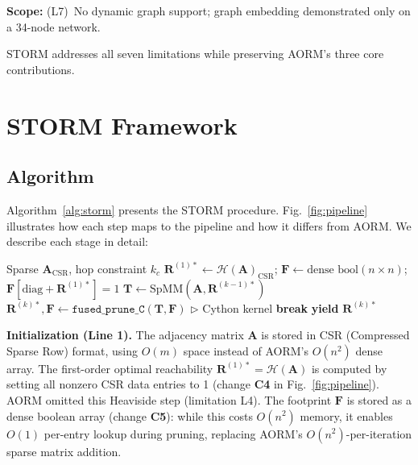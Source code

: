 \documentclass[journal]{IEEEtran}
\begin{document}
\textbf{Scope:} (L7)~No dynamic graph support; graph embedding demonstrated only on a 34-node network.

STORM addresses all seven limitations while preserving AORM's three core contributions.


\section{STORM Framework}
\label{sec:storm}

\subsection{Algorithm}

Algorithm~\ref{alg:storm} presents the STORM procedure. Fig.~\ref{fig:pipeline} illustrates how each step maps to the pipeline and how it differs from AORM. We describe each stage in detail:

\begin{algorithm}[t]
\caption{STORM: Sparse $k$-Order Optimal Reachability}
\label{alg:storm}
\begin{algorithmic}[1]
\REQUIRE Sparse $\mathbf{A}_{\text{CSR}}$, hop constraint $k_c$
\STATE $\mathbf{R}^{(1)*}\!\leftarrow\!\mathcal{H}(\mathbf{A})_{\text{CSR}}$;\; $\mathbf{F}\!\leftarrow\!\text{dense bool}(n\!\times\!n)$;\; $\mathbf{F}[\text{diag}+\mathbf{R}^{(1)*}]\!=\!1$
  \STATE $\mathbf{T} \leftarrow \text{SpMM}(\mathbf{A},\mathbf{R}^{(k-1)*})$
  \STATE $\mathbf{R}^{(k)*},\mathbf{F} \leftarrow \texttt{fused\_prune\_C}(\mathbf{T}, \mathbf{F})$ \hfill{\footnotesize$\triangleright$ Cython kernel}
   \STATE \textbf{break} \ENDIF
  \STATE \textbf{yield} $\mathbf{R}^{(k)*}$
\ENDFOR
\end{algorithmic}
\end{algorithm}

\textbf{Initialization (Line 1).} The adjacency matrix $\mathbf{A}$ is stored in CSR (Compressed Sparse Row) format, using $O(m)$ space instead of AORM's $O(n^2)$ dense array. The first-order optimal reachability $\mathbf{R}^{(1)*} = \mathcal{H}(\mathbf{A})$ is computed by setting all nonzero CSR data entries to 1 (change \textbf{C4} in Fig.~\ref{fig:pipeline}). AORM omitted this Heaviside step (limitation L4). The footprint $\mathbf{F}$ is stored as a dense boolean array (change \textbf{C5}): while this costs $O(n^2)$ memory, it enables $O(1)$ per-entry lookup during pruning, replacing AORM's $O(n^2)$-per-iteration sparse matrix addition.
\end{document}
